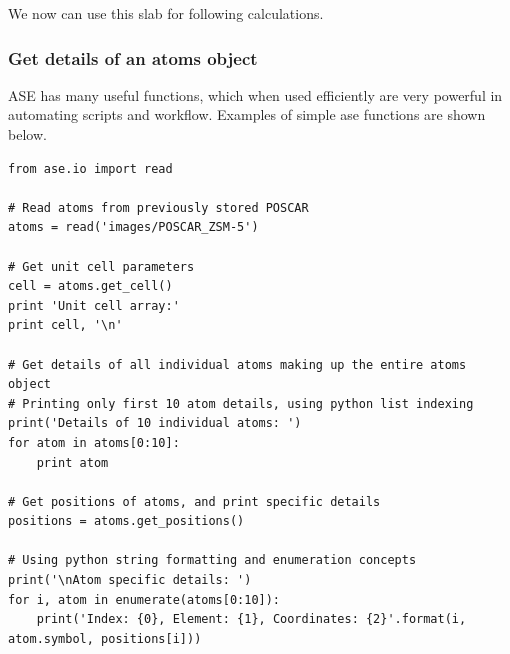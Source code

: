 \documentclass[11pt]{article}
\begin{document}
We now can use this slab for following calculations.  

\subsubsection{Get details of an atoms object}
\label{sec:org0daccfb}
ASE has many useful functions, which when used efficiently are very powerful in automating scripts and workflow. Examples of simple ase functions are shown below.
\begin{verbatim}
from ase.io import read

# Read atoms from previously stored POSCAR
atoms = read('images/POSCAR_ZSM-5')

# Get unit cell parameters
cell = atoms.get_cell()
print 'Unit cell array:' 
print cell, '\n'

# Get details of all individual atoms making up the entire atoms object
# Printing only first 10 atom details, using python list indexing
print('Details of 10 individual atoms: ')
for atom in atoms[0:10]:
    print atom

# Get positions of atoms, and print specific details
positions = atoms.get_positions()

# Using python string formatting and enumeration concepts
print('\nAtom specific details: ')
for i, atom in enumerate(atoms[0:10]):
    print('Index: {0}, Element: {1}, Coordinates: {2}'.format(i, atom.symbol, positions[i]))
\end{verbatim}
\end{document}
